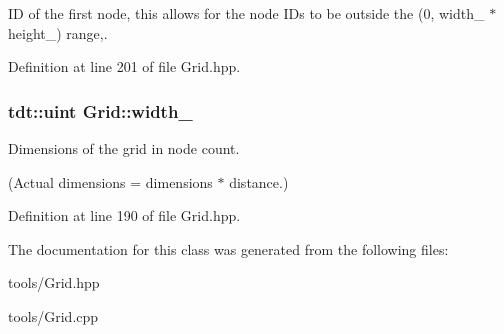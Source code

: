ID of the first node, this allows for the node I\+Ds to be outside the (0, width\+\_\+ $\ast$ height\+\_\+) range,. 



Definition at line 201 of file Grid.\+hpp.

\subsubsection[{\texorpdfstring{width\+\_\+}{width_}}]{\setlength{\rightskip}{0pt plus 5cm}tdt\+::uint Grid\+::width\+\_\+\hspace{0.3cm}{\ttfamily [private]}}\hypertarget{class_grid_a43488ca041b50c8926de53d2cbcd3070}{}\label{class_grid_a43488ca041b50c8926de53d2cbcd3070}


Dimensions of the grid in node count. 

(Actual dimensions = dimensions $\ast$ distance.) 

Definition at line 190 of file Grid.\+hpp.



The documentation for this class was generated from the following files\+:\begin{DoxyCompactItemize}
\item 
tools/Grid.\+hpp\item 
tools/Grid.\+cpp\end{DoxyCompactItemize}
